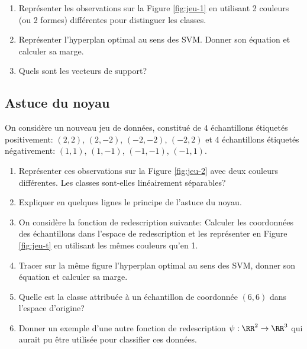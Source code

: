 \documentclass[11pt]{article}
\begin{document}
\begin{enumerate}
	\item Représenter les observations sur la Figure \ref{fig:jeu-1} en utilisant 2 couleurs (ou 2 formes) différentes pour distinguer les classes.
	\item Représenter l'hyperplan optimal au sens des SVM. Donner son équation et calculer sa marge.
	\item Quels sont les vecteurs de support?
\end{enumerate}

\subsection{Astuce du noyau}
On considère un nouveau jeu de données, constitué de $4$ échantillons étiquetés positivement: $(2,2)$, $(2,-2)$, $(-2,-2)$, $(-2,2)$ et $4$ échantillons étiquetés négativement: $(1,1)$, $(1,-1)$, $(-1,-1)$, $(-1,1)$.

\begin{enumerate}
	\item Représenter ces observations sur la Figure \ref{fig:jeu-2} avec deux couleurs différentes. Les classes sont-elles linéairement séparables?
	
	\item Expliquer en quelques lignes le principe de l'astuce du noyau.
	
	\item On considère la fonction de redescription suivante:
	Calculer les coordonnées des échantillons dans l'espace de redescription et les représenter en Figure \ref{fig:jeu-t} en utilisant les mêmes couleurs qu'en 1.
	
	\item Tracer sur la même figure l'hyperplan optimal au sens des SVM, donner son équation et calculer sa marge.
	
	\item Quelle est la classe attribuée à un échantillon de coordonnée $(6,6)$ dans l'espace d'origine?
	
	\item Donner un exemple d'une autre fonction de redescription $\psi : \RR^2 \to \RR^3$ qui aurait pu être utilisée pour classifier ces données.
\end{enumerate}
\end{document}
